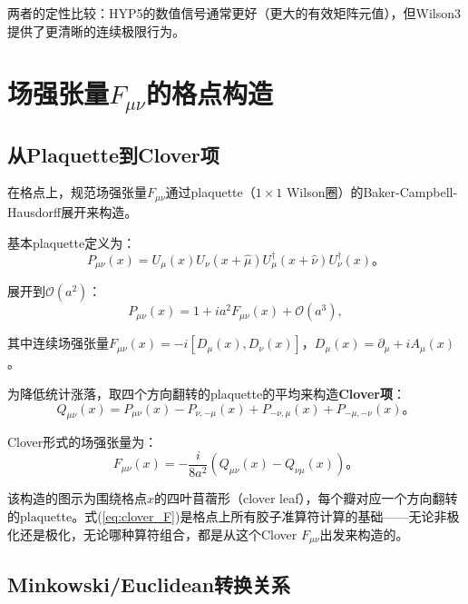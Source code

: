 \documentclass[12pt,a4paper]{ctexart}
\theoremstyle{definition}
\begin{document}
两者的定性比较：HYP5的数值信号通常更好（更大的有效矩阵元值），但Wilson3提供了更清晰的连续极限行为。

\section{场强张量$F_{\mu\nu}$的格点构造}

\subsection{从Plaquette到Clover项}

在格点上，规范场强张量$F_{\mu\nu}$通过plaquette（$1\times1$ Wilson圈）的Baker-Campbell-Hausdorff展开来构造\cite{NoteGluonPDFs,Gattringer2010}。

基本plaquette定义为：
\begin{equation}
P_{\mu\nu}(x) = U_\mu(x) U_\nu(x+\hat{\mu}) U_\mu^\dagger(x+\hat{\nu}) U_\nu^\dagger(x)。
\end{equation}

展开到$\mathcal{O}(a^2)$：
\begin{equation}
P_{\mu\nu}(x) = 1 + ia^2 F_{\mu\nu}(x) + \mathcal{O}(a^3),
\end{equation}

其中连续场强张量$F_{\mu\nu}(x)=-i[D_\mu(x),D_\nu(x)]$，$D_\mu(x)=\partial_\mu+iA_\mu(x)$。

为降低统计涨落，取四个方向翻转的plaquette的平均来构造\textbf{Clover项}\cite{NoteGluonPDFs,Gattringer2010}：
\begin{equation}
\boxed{Q_{\mu\nu}(x) = P_{\mu\nu}(x) - P_{\nu,-\mu}(x) + P_{-\nu,\mu}(x) + P_{-\mu,-\nu}(x)}。
\end{equation}

Clover形式的场强张量为：
\begin{equation}
\boxed{F_{\mu\nu}(x) = -\frac{i}{8a^2}(Q_{\mu\nu}(x) - Q_{\nu\mu}(x))}。
\label{eq:clover_F}
\end{equation}

该构造的图示为围绕格点$x$的四叶苜蓿形（clover leaf），每个瓣对应一个方向翻转的plaquette\cite{NoteGluonPDFs}。式(\ref{eq:clover_F})是格点上所有胶子准算符计算的基础——无论非极化还是极化，无论哪种算符组合，都是从这个Clover $F_{\mu\nu}$出发来构造的。

\subsection{Minkowski/Euclidean转换关系}
\end{document}

